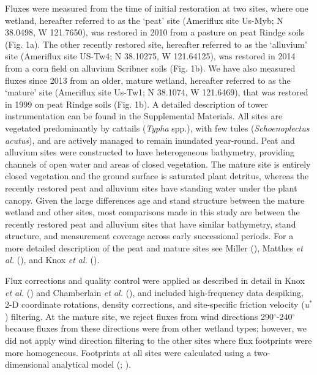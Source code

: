 \documentclass[
  12pt,
]{article}
\begin{document}
Fluxes were measured from the time of initial restoration at two sites,
where one wetland, hereafter referred to as the `peat' site (Ameriflux
site Us-Myb; N 38.0498, W 121.7650), was restored in 2010 from a pasture
on peat Rindge soils (Fig. 1a). The other recently restored site,
hereafter referred to as the `alluvium' site (Ameriflux site US-Tw4; N
38.10275, W 121.64125), was restored in 2014 from a corn field on
alluvium Scribner soils (Fig. 1b). We have also measured fluxes since
2013 from an older, mature wetland, hereafter referred to as the
`mature' site (Ameriflux site Us-Tw1; N 38.1074, W 121.6469), that was
restored in 1999 on peat Rindge soils (Fig. 1b). A detailed description
of tower instrumentation can be found in the Supplemental Materials. All
sites are vegetated predominantly by cattails (\emph{Typha} spp.), with
few tules (\emph{Schoenoplectus acutus}), and are actively managed to
remain inundated year-round. Peat and alluvium sites were constructed to
have heterogeneous bathymetry, providing channels of open water and
areas of closed vegetation. The mature site is entirely closed
vegetation and the ground surface is saturated plant detritus, whereas
the recently restored peat and alluvium sites have standing water under
the plant canopy. Given the large differences age and stand structure
between the mature wetland and other sites, most comparisons made in
this study are between the recently restored peat and alluvium sites
that have similar bathymetry, stand structure, and measurement coverage
across early successional periods. For a more detailed description of
the peat and mature sites see Miller
(), Matthes \emph{et al.}
(), and Knox \emph{et al.}
().

Flux corrections and quality control were applied as described in detail
in Knox \emph{et al.} () and
Chamberlain \emph{et al.}
(), and included
high-frequency data despiking, 2-D coordinate rotations, density
corrections, and site-specific friction velocity (\emph{u\(^\ast\)})
filtering. At the mature site, we reject fluxes from wind directions
290\(^\circ\)-240\(^\circ\) because fluxes from these directions were
from other wetland types; however, we did not apply wind direction
filtering to the other sites where flux footprints were more
homogeneous. Footprints at all sites were calculated using a
two-dimensional analytical model
(;
).
\end{document}
